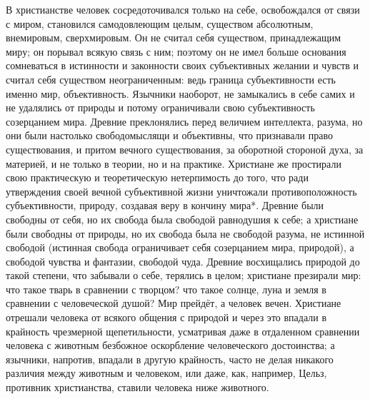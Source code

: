\documentclass[12pt,oneside]{book}
\begin{document}
В христианстве человек сосредоточивался только на себе, освобождался от связи с миром, становился самодовлеющим целым, существом абсолютным, внемировым, сверхмировым. Он не считал себя существом, принадлежащим миру; он порывал всякую связь с ним; поэтому он не имел больше основания сомневаться в истинности и законности своих субъективных желании и чувств и считал себя существом неограниченным: ведь граница субъективности есть именно мир, объективность. Язычники наоборот, не замыкались в себе самих и не удалялись от природы и потому ограничивали свою субъективность созерцанием мира. Древние преклонялись перед величием интеллекта, разума, но они были настолько свободомыслящи и объективны, что признавали право существования, и притом вечного существования, за оборотной стороной духа, за материей, и не только в теории, но и на практике. Христиане же простирали свою практическую и теоретическую нетерпимость до того, что ради утверждения своей вечной субъективной жизни уничтожали противоположность субъективности, природу, создавая веру в кончину мира*\let\svthefootnote\thefootnote\let\thefootnote\relax{}\let\thefootnote\svthefootnote. Древние были свободны от себя, но их свобода была свободой равнодушия к себе; а христиане были свободны от природы, но их свобода была не свободой разума, не истинной свободой (истинная свобода ограничивает себя созерцанием мира, природой), а свободой чувства и фантазии, свободой чуда. Древние восхищались природой до такой степени, что забывали о себе, терялись в целом; христиане презирали мир: что такое тварь в сравнении с творцом? что такое солнце, луна и земля в сравнении с человеческой душой? Мир прейдёт, а человек вечен. Христиане отрешали человека от всякого общения с природой и через это впадали в крайность чрезмерной щепетильности, усматривая даже в отдаленном сравнении человека с животным безбожное оскорбление человеческого достоинства; а язычники, напротив, впадали в другую крайность, часто не делая никакого различия между животным и человеком, или даже, как, например, Цельз, противник христианства, ставили человека ниже животного.
\end{document}
